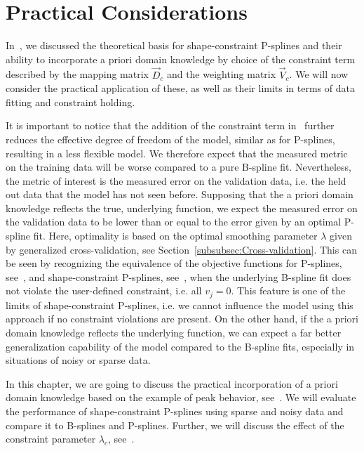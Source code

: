 \chapter{Practical Considerations}

In~, we discussed the theoretical basis for shape-constraint P-splines and their ability to incorporate a priori domain knowledge by choice of the constraint term described by the mapping matrix $\vec{D}_c$ and the weighting matrix $\vec{V}_c$. We will now consider the practical application of these, as well as their limits in terms of data fitting and constraint holding. 

It is important to notice that the addition of the constraint term in~ further reduces the effective degree of freedom of the model, similar as for P-splines, resulting in a less flexible model. We therefore expect that the measured metric on the training data will be worse compared to a pure B-spline fit. Nevertheless, the metric of interest is the measured error on the validation data, i.e. the held out data that the model has not seen before. Supposing that the a priori domain knowledge reflects the true, underlying function, we expect the measured error on the validation data to be lower than or equal to the error given by an optimal P-spline fit. Here, optimality is based on the optimal smoothing parameter $\lambda$ given by generalized cross-validation, see Section~\ref{subsubsec:Cross-validation}. This can be seen by recognizing the equivalence of the objective functions for P-splines, see~, and shape-constraint P-splines, see~, when the underlying B-spline fit does not violate the user-defined constraint, i.e. all $v_j=0$. This feature is one of the limits of shape-constraint P-splines, i.e. we cannot influence the model using this approach if no constraint violations are present. On the other hand, if the a priori domain knowledge reflects the underlying function, we can expect a far better generalization capability of the model compared to the B-spline fits, especially in situations of noisy or sparse data.

In this chapter, we are going to discuss the practical incorporation of a priori domain knowledge based on the example of peak behavior, see~. We will evaluate the performance of shape-constraint P-splines using sparse and noisy data and compare it to B-splines and P-splines. Further, we will discuss the effect of the constraint parameter $\lambda_c$, see~.

